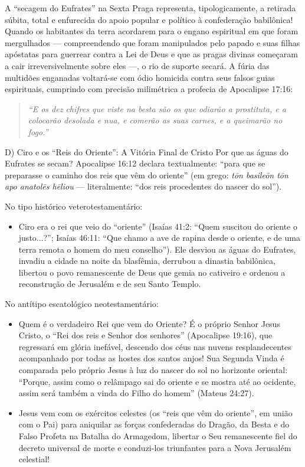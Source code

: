 A ``secagem do Eufrates'' na Sexta Praga representa, tipologicamente, a retirada súbita, total e enfurecida do apoio popular e político à confederação babilônica! Quando os habitantes da terra acordarem para o engano espiritual em que foram mergulhados — compreendendo que foram manipulados pelo papado e suas filhas apóstatas para guerrear contra a Lei de Deus e que as pragas divinas começaram a cair irreversivelmente sobre eles —, o rio de suporte secará. A fúria das multidões enganadas voltará-se com ódio homicida contra seus falsos guias espirituais, cumprindo com precisão milimétrica a profecia de Apocalipse 17:16:

\begin{quote}
\itshape ``E os dez chifres que viste na besta são os que odiarão a prostituta, e a colocarão desolada e nua, e comerão as suas carnes, e a queimarão no fogo.''
\end{quote}


D) Ciro e os ``Reis do Oriente'': A Vitória Final de Cristo
Por que as águas do Eufrates se secam? Apocalipse 16:12 declara textualmente: ``para que se preparasse o caminho dos reis que vêm do oriente'' (em grego: \textit{tōn basileōn tōn apo anatolēs hēliou} — literalmente: ``dos reis procedentes do nascer do sol'').

No tipo histórico veterotestamentário:
\begin{itemize}
  \item Ciro era o rei que veio do ``oriente'' (Isaías 41:2: ``Quem suscitou do oriente o justo...?''; Isaías 46:11: ``Que chamo a ave de rapina desde o oriente, e de uma terra remota o homem do meu conselho''). Ele desviou as águas do Eufrates, invadiu a cidade na noite da blasfêmia, derrubou a dinastia babilônica, libertou o povo remanescente de Deus que gemia no cativeiro e ordenou a reconstrução de Jerusalém e de seu Santo Templo.
\end{itemize}


No antítipo escatológico neotestamentário:
\begin{itemize}
  \item Quem é o verdadeiro Rei que vem do Oriente? É o próprio Senhor Jesus Cristo, o ``Rei dos reis e Senhor dos senhores'' (Apocalipse 19:16), que regressará em glória inefável, descendo dos céus nas nuvens resplandecentes acompanhado por todas as hostes dos santos anjos! Sua Segunda Vinda é comparada pelo próprio Jesus à luz do nascer do sol no horizonte oriental: ``Porque, assim como o relâmpago sai do oriente e se mostra até ao ocidente, assim será também a vinda do Filho do homem'' (Mateus 24:27).
  \item Jesus vem com os exércitos celestes (os ``reis que vêm do oriente'', em união com o Pai) para aniquilar as forças confederadas do Dragão, da Besta e do Falso Profeta na Batalha do Armagedom, libertar o Seu remanescente fiel do decreto universal de morte e conduzi-los triunfantes para a Nova Jerusalém celestial!
\end{itemize}


